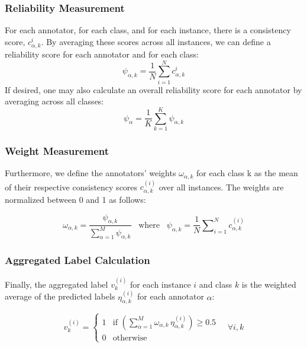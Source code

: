 \subsubsection{Reliability Measurement}
For each annotator, for each class, and for each instance, there is a consistency score, $c_{\alpha,k}^i$. By averaging these scores across all instances, we can define a reliability score for each annotator and for each class:
\begin{equation}
\psi_{\alpha,k}=\frac{1}{N}\sum_{i=1}^N c_{\alpha,k}^i
\end{equation}
If desired, one may also calculate an overall reliability score for each annotator by averaging across all classes:
\begin{equation}
\psi_{\alpha}=\frac{1}{K}\sum_{k=1}^K \psi_{\alpha,k}
\end{equation}


\subsubsection{Weight Measurement}

Furthermore, we define the annotators' weights $\omega_{\alpha,k}$ for each class k as the mean of their respective consistency scores $c_{\alpha,k}^{(i)} $ over all instances. The weights are normalized between 0 and 1 as follows:

\begin{equation}
    \omega_{\alpha,k}=\frac{\psi_{\alpha,k}}{\sum_{\alpha=1}^ M\psi_{\alpha,k}}\;\;\;\text{where}\;\;\; \psi_{\alpha,k}=\frac1N\sum\nolimits_{i=1}^{N}c_{\alpha,k}^{(i)}
    \label{eq:crowd.eq.11.weights}
\end{equation}

\subsubsection{Aggregated Label Calculation}

Finally, the aggregated label $v_k^{(i)} $ for each instance $i $ and class $k $ is the weighted average of the predicted labels $\eta_{\alpha,k}^{(i)} $ for each annotator $\alpha $:

\begin{equation}
    v_k^{(i)} =
    \begin{cases}
        1 & \text{if } \left(\sum_{\alpha=1}^{M} \omega_{\alpha,k}\, \eta_{\alpha,k}^{(i)}\right) \geq 0.5 \\
        0 & \text{otherwise}
    \end{cases}
    \quad \forall i, k
    \label{eq:crowd.eq.12.aggregated-label}
\end{equation}

